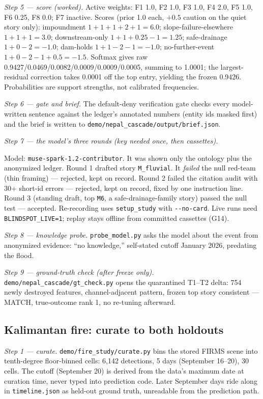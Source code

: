 \documentclass[11pt]{article}
\begin{document}
\emph{Step 5 --- score (worked).} Active weights: F1 1.0, F2 1.0, F3 1.0, F4
2.0, F5 1.0, F6 0.25, F8 0.0; F7 inactive. Scores (prior 1.0 each, $+0.5$
caution on the quiet story only):
impoundment $1+1+1+2+1=6.0$; slope-failure-elsewhere $1+1+1=3.0$;
downstream-only $1+1+0.25-1=1.25$; safe-drainage $1+0-2=-1.0$; dam-holds
$1+1-2-1=-1.0$; no-further-event $1+0-2-1+0.5=-1.5$. Softmax gives raw
0.9427/0.0469/0.0082/0.0009/0.0009/0.0005, summing to 1.0001; the
largest-residual correction takes 0.0001 off the top entry, yielding the
frozen 0.9426. Probabilities are support strengths, not calibrated
frequencies.

\emph{Step 6 --- gate and brief.} The default-deny verification gate checks
every model-written sentence against the ledger's annotated numbers (entity
ids masked first) and the brief is written to
\verb|demo/nepal_cascade/output/brief.json|.

\emph{Step 7 --- the model's three rounds (key needed once, then cassettes).}

Model: \verb|muse-spark-1.2-contributor|. It was shown only the ontology
plus the anonymized ledger. Round 1 drafted story \verb|M_fluvial|. It
\emph{failed} the null red-team (thin framing) --- rejected, kept on record.
Round 2 failed the citation audit with 30+ short-id errors --- rejected, kept
on record, fixed by one instruction line. Round 3 (standing draft, top
\verb|M6|, a safe-drainage-family story) passed the null test --- accepted.
Re-recording uses \verb|setup_study| with \verb|--no-card|. Live runs need
\verb|BLINDSPOT_LIVE=1|; replay stays offline from committed cassettes (G14).

\emph{Step 8 --- knowledge probe.} \verb|probe_model.py| asks the model about
the event from anonymized evidence: ``no knowledge,'' self-stated cutoff
January 2026, predating the flood.

\emph{Step 9 --- ground-truth check (after freeze only).}
\verb|demo/nepal_cascade/gt_check.py| opens the quarantined T1--T2 delta:
754 newly destroyed features, channel-adjacent pattern, frozen top story
consistent --- MATCH, true-outcome rank 1, no re-tuning afterward.

\subsection{Kalimantan fire: curate to both holdouts}

\emph{Step 1 --- curate.} \verb|demo/fire_study/curate.py| bins the stored
FIRMS scene into tenth-degree floor-binned cells: 6,142 detections, 5 days
(September 16--20), 30 cells. The cutoff (September 20) is derived from the
data's maximum date at curation time, never typed into prediction code.
Later September days ride along in \verb|timeline.json| as held-out ground
truth, unreadable from the prediction path.
\end{document}
